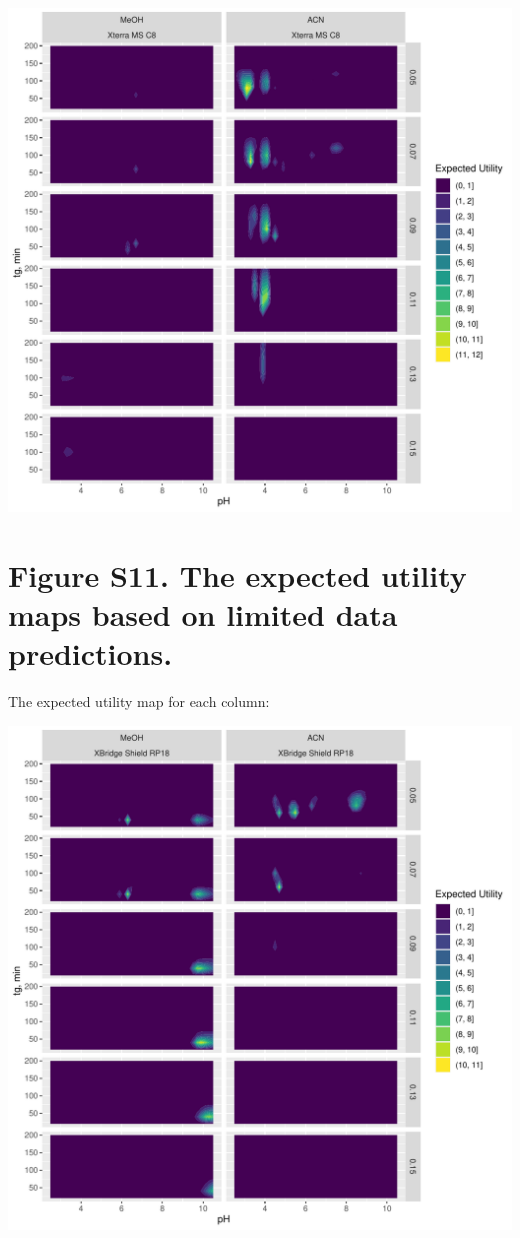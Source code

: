 \documentclass[
]{article}
\begin{document}
\newpage{}

\includegraphics{../figures/casestudy1/utilitymap/utilitymap5.pdf}

\newpage{}

\hypertarget{figure-s11.-the-expected-utility-maps-based-on-limited-data-predictions.}{%
\section{Figure S11. The expected utility maps based on limited data
predictions.}\label{figure-s11.-the-expected-utility-maps-based-on-limited-data-predictions.}}

The expected utility map for each column:

\includegraphics{../figures/casestudy2/utilitymap/utilitymap1.pdf}
\end{document}
